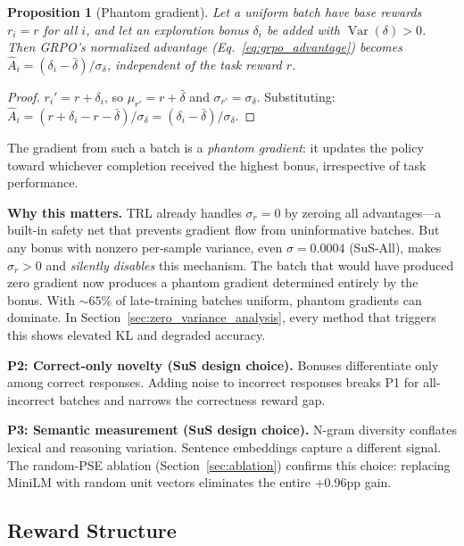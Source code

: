 \documentclass[10pt]{article}
\newtheorem{proposition}{Proposition}
\begin{document}
\begin{proposition}[Phantom gradient]
\label{prop:phantom}
Let a uniform batch have base rewards $r_i = r$ for all $i$, and let an exploration bonus $\delta_i$ be added with $\operatorname{Var}(\delta) > 0$. Then GRPO's normalized advantage (Eq.~\ref{eq:grpo_advantage}) becomes $\hat{A}_i = (\delta_i - \bar{\delta}) / \sigma_\delta$, independent of the task reward $r$.
\end{proposition}

\begin{proof}
$r_i' = r + \delta_i$, so $\mu_{r'} = r + \bar{\delta}$ and $\sigma_{r'} = \sigma_\delta$. Substituting: $\hat{A}_i = (r + \delta_i - r - \bar{\delta}) / \sigma_\delta = (\delta_i - \bar{\delta}) / \sigma_\delta$.
\end{proof}

The gradient from such a batch is a \emph{phantom gradient}: it updates the policy toward whichever completion received the highest bonus, irrespective of task performance.

\textbf{Why this matters.} TRL \citep{vonwerra2022trl} already handles $\sigma_r{=}0$ by zeroing all advantages---a built-in safety net that prevents gradient flow from uninformative batches. But any bonus with nonzero per-sample variance, even $\sigma{=}0.0004$ (SuS-All), makes $\sigma_r > 0$ and \emph{silently disables} this mechanism. The batch that would have produced zero gradient now produces a phantom gradient determined entirely by the bonus. With ${\sim}65\%$ of late-training batches uniform, phantom gradients can dominate. In Section~\ref{sec:zero_variance_analysis}, every method that triggers this shows elevated KL and degraded accuracy.

\textbf{P2: Correct-only novelty (SuS design choice).}
Bonuses differentiate only among correct responses. Adding noise to incorrect responses breaks P1 for all-incorrect batches and narrows the correctness reward gap.

\textbf{P3: Semantic measurement (SuS design choice).}
N-gram diversity conflates lexical and reasoning variation. Sentence embeddings capture a different signal. The random-PSE ablation (Section~\ref{sec:ablation}) confirms this choice: replacing MiniLM with random unit vectors eliminates the entire +0.96pp gain.

\subsection{Reward Structure}
\label{sec:reward_structure}
\end{document}
